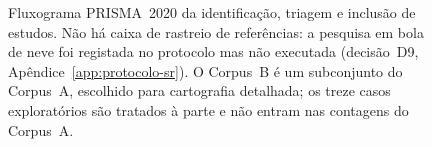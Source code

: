 \begin{figure}[htbp]
  \caption[Fluxograma PRISMA 2020 da seleção de estudos]%
  {Fluxograma PRISMA~2020 da identificação, triagem e inclusão de estudos.
   Não há caixa de rastreio de referências: a pesquisa em bola de neve foi
   registada no protocolo mas não executada (decisão~D9,
   Apêndice~\ref{app:protocolo-sr}). O Corpus~B é um subconjunto do
   Corpus~A, escolhido para cartografia detalhada; os treze casos
   exploratórios são tratados à parte e não entram nas contagens do
   Corpus~A.}
  \label{fig:prisma}
\end{figure}
